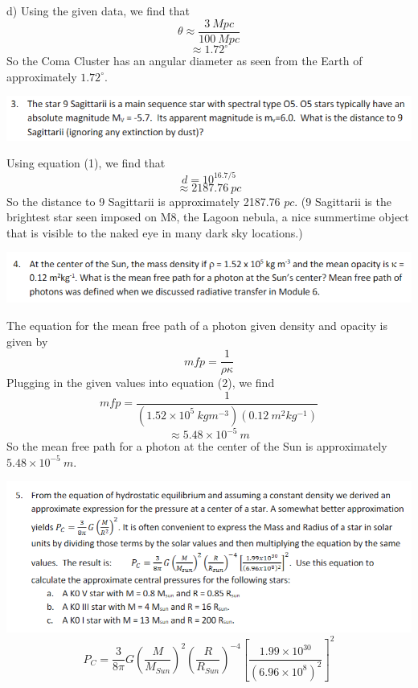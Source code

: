 \documentclass{article}
\begin{document}
d) Using the given data, we find that 
\[\theta \approx \frac{3 \:Mpc}{100 \: Mpc}\]
\[\approx 1.72^{\circ}\]
So the Coma Cluster has an angular diameter as seen from the Earth of approximately $1.72^{\circ}$.
\newline

\includegraphics[scale = 0.8]{probset7prob3.PNG}

Using equation (1), we find that
\[d = 10^{16.7/5}\]
\[\approx 2187.76 \:pc\]
So the distance to 9 Sagittarii is approximately 2187.76 $pc$. (9 Sagittarii is the brightest star seen imposed on M8, the Lagoon nebula, a nice summertime object that is visible to the naked eye in many dark sky locations.)
\newline

\includegraphics[scale = 0.8]{probset7prob4.PNG}

The equation for the mean free path of a photon given density and opacity is given by
\begin{equation}
    mfp = \frac{1}{\rho \kappa}
\end{equation}
Plugging in the given values into equation (2), we find 
\[mfp = \frac{1}{(1.52 \times 10^{5} \:kg m^{-3})(0.12 \:m^2 kg^{-1})}\]
\[\approx 5.48 \times 10^{-5} \:m\]
So the mean free path for a photon at the center of the Sun is approximately $5.48 \times 10^{-5} \:m$.
\newline

\includegraphics[scale = 0.8]{probset7prob5.PNG}
\begin{equation}
    P_C = \frac{3}{8\pi}G\left(\frac{M}{M_{Sun}}\right)^2\left(\frac{R}{R_{Sun}}\right)^{-4}\left[\frac{1.99 \times 10^{30}}{(6.96 \times 10^8)^2}\right]^2
\end{equation}
\end{document}
